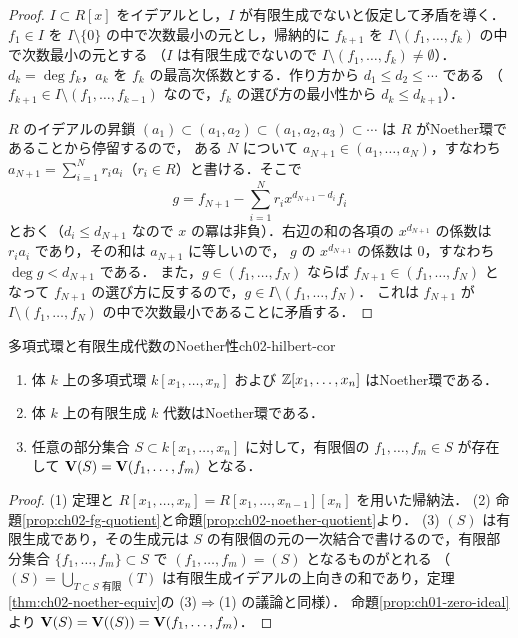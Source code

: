 \begin{proof}
$I\subset R[x]$ をイデアルとし，$I$ が有限生成でないと仮定して矛盾を導く．
$f_1\in I$ を $I\setminus\{0\}$ の中で次数最小の元とし，帰納的に $f_{k+1}$ を $I\setminus(f_1,\dots,f_k)$ の中で次数最小の元とする
（$I$ は有限生成でないので $I\setminus(f_1,\dots,f_k)\ne\emptyset$）．
$d_k=\deg f_k$，$a_k$ を $f_k$ の最高次係数とする．作り方から $d_1\le d_2\le\cdots$ である
（$f_{k+1}\in I\setminus(f_1,\dots,f_{k-1})$ なので，$f_k$ の選び方の最小性から $d_k\le d_{k+1}$）．

$R$ のイデアルの昇鎖 $(a_1)\subset(a_1,a_2)\subset(a_1,a_2,a_3)\subset\cdots$ は $R$ がNoether環であることから停留するので，
ある $N$ について $a_{N+1}\in(a_1,\dots,a_N)$，すなわち $a_{N+1}=\sum_{i=1}^Nr_ia_i$（$r_i\in R$）と書ける．そこで
\[
  g=f_{N+1}-\sum_{i=1}^Nr_ix^{d_{N+1}-d_i}f_i
\]
とおく（$d_i\le d_{N+1}$ なので $x$ の冪は非負）．右辺の和の各項の $x^{d_{N+1}}$ の係数は $r_ia_i$ であり，その和は $a_{N+1}$ に等しいので，
$g$ の $x^{d_{N+1}}$ の係数は $0$，すなわち $\deg g<d_{N+1}$ である．
また，$g\in(f_1,\dots,f_N)$ ならば $f_{N+1}\in(f_1,\dots,f_N)$ となって $f_{N+1}$ の選び方に反するので，$g\in I\setminus(f_1,\dots,f_N)$．
これは $f_{N+1}$ が $I\setminus(f_1,\dots,f_N)$ の中で次数最小であることに矛盾する．
\end{proof}

\begin{mycor}{多項式環と有限生成代数のNoether性}{ch02-hilbert-cor}
\begin{enumerate}
  \item 体 $k$ 上の多項式環 $k[x_1,\dots,x_n]$ および $\mathbb{Z}[x_1,\dots,x_n]$ はNoether環である．
  \item 体 $k$ 上の有限生成 $k$ 代数はNoether環である．
  \item 任意の部分集合 $S\subset k[x_1,\dots,x_n]$ に対して，有限個の $f_1,\dots,f_m\in S$ が存在して $\mathbf{V}(S)=\mathbf{V}(f_1,\dots,f_m)$ となる．
\end{enumerate}
\end{mycor}

\begin{proof}
(1) 定理と $R[x_1,\dots,x_n]=R[x_1,\dots,x_{n-1}][x_n]$ を用いた帰納法．
(2) 命題\ref{prop:ch02-fg-quotient}と命題\ref{prop:ch02-noether-quotient}より．
(3) $(S)$ は有限生成であり，その生成元は $S$ の有限個の元の一次結合で書けるので，有限部分集合 $\{f_1,\dots,f_m\}\subset S$ で $(f_1,\dots,f_m)=(S)$ となるものがとれる
（$(S)=\bigcup_{T\subset S\text{ 有限}}(T)$ は有限生成イデアルの上向きの和であり，定理\ref{thm:ch02-noether-equiv}の (3)$\Rightarrow$(1) の議論と同様）．
命題\ref{prop:ch01-zero-ideal}より $\mathbf{V}(S)=\mathbf{V}((S))=\mathbf{V}(f_1,\dots,f_m)$．
\end{proof}

